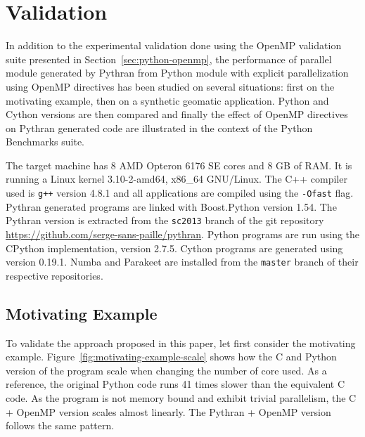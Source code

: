 \documentclass[conference]{IEEEtran}
\begin{document}
\section{Validation}\label{sec:validation}

In addition to the experimental validation done using the OpenMP validation
suite presented in Section~\ref{sec:python-openmp}, the performance of parallel
module generated by Pythran from Python module with explicit parallelization
using OpenMP directives has been studied on several situations: first on the
motivating example, then on a synthetic geomatic application. Python and Cython
versions are then compared and finally the effect of OpenMP directives on
Pythran generated code are illustrated in the context of the Python Benchmarks
suite.

The target machine has  8 AMD Opteron 6176 SE cores and 8 GB of RAM. It is
running a Linux kernel 3.10-2-amd64, x86\_64 GNU/Linux. The C++ compiler used is
\texttt{g++} version 4.8.1 and all applications are compiled using the
\texttt{-Ofast} flag. Pythran generated programs are linked with Boost.Python
version 1.54. The Pythran version is extracted from the \texttt{sc2013} branch
of the git repository \url{https://github.com/serge-sans-paille/pythran}. Python
programs are run using the CPython implementation, version 2.7.5. Cython
programs are generated using version 0.19.1. Numba and Parakeet are installed
from the \texttt{master} branch of their respective repositories.

\subsection{Motivating Example}

To validate the approach proposed in this paper, let first consider the
motivating example. Figure~\ref{fig:motivating-example-scale} shows how the C
and Python version of the program scale when changing the number of core used.
As a reference, the original Python code runs 41 times slower than the
equivalent C code. As the program is not memory bound and exhibit trivial
parallelism, the C + OpenMP version scales almost linearly. The Pythran + OpenMP
version follows the same pattern.
\end{document}
